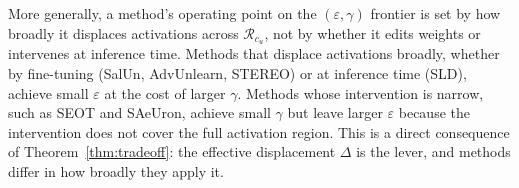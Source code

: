\begin{remark}
\label{rem:finetuning}
More generally, a method's operating point on the $(\varepsilon,\gamma)$ frontier is set by how broadly it displaces activations across $\mathcal{R}_{c_u}$, not by whether it edits weights or intervenes at inference time. Methods that displace activations broadly, whether by fine-tuning (SalUn, AdvUnlearn, STEREO) or at inference time (SLD), achieve small $\varepsilon$ at the cost of larger $\gamma$. Methods whose intervention is narrow, such as SEOT and SAeUron, achieve small $\gamma$ but leave larger $\varepsilon$ because the intervention does not cover the full activation region. This is a direct consequence of Theorem~\ref{thm:tradeoff}: the effective displacement $\Delta$ is the lever, and methods differ in how broadly they apply it.
\end{remark}




